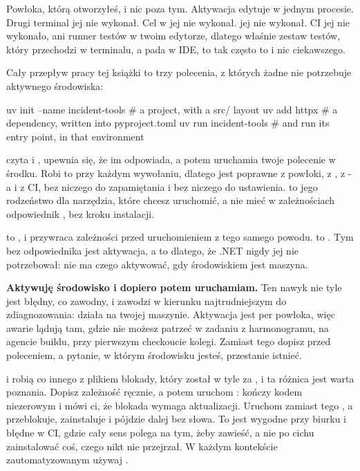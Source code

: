 Powłoka, którą otworzyłeś, i nic poza tym. Aktywacja edytuje  w
jednym procesie. Drugi terminal jej nie wykonał. Cel w  jej nie
wykonał.  jej nie wykonał. CI jej nie wykonało, ani runner testów w
twoim edytorze, dlatego właśnie zestaw testów, który przechodzi w terminalu, a
pada w IDE, to tak często to i nic ciekawszego.

Cały przepływ pracy tej książki to trzy polecenia, z których żadne nie
potrzebuje aktywnego środowiska:

\begin{shellcmd}
uv init --name incident-tools  # a project, with a src/ layout
uv add httpx                   # a dependency, written into pyproject.toml
uv run incident-tools          # and run its entry point, in that environment
\end{shellcmd}

\noindent
{} czyta  i , upewnia się, że
 im odpowiada, a potem uruchamia twoje polecenie w środku. Robi to
przy każdym wywołaniu, dlatego jest poprawne z powłoki, z , z
-a i z CI, bez niczego do zapamiętania i bez niczego do
ustawienia.  to jego rodzeństwo dla narzędzia, które chcesz
uruchomić, a nie mieć w zależnościach \dash{} odpowiednik ,
bez kroku instalacji.

\begin{csbox}
 to , i przywraca zależności przed
uruchomieniem z tego samego powodu.  to . Tym bez odpowiednika jest aktywacja, a to dlatego, że .NET nigdy jej
nie potrzebował: nie ma czego aktywować, gdy środowiskiem jest maszyna.
\end{csbox}

\begin{trapbox}
\textbf{Aktywuję środowisko i dopiero potem uruchamiam.} Ten nawyk nie tyle
jest błędny, co zawodny, i zawodzi w kierunku najtrudniejszym do
zdiagnozowania: działa na twojej maszynie. Aktywacja jest per powłoka, więc
awarie lądują tam, gdzie nie możesz patrzeć \dash{} w zadaniu z
harmonogramu, na agencie buildu, przy pierwszym checkoucie kolegi. Zamiast
tego dopisz  przed poleceniem, a pytanie, w którym środowisku
jesteś, przestanie istnieć.
\end{trapbox}

\begin{warning}
 i  robią co innego z plikiem blokady,
który został w tyle za , i ta różnica jest warta
poznania. Dopisz zależność ręcznie, a potem uruchom :
kończy kodem niezerowym i mówi ci, że blokada wymaga aktualizacji. Uruchom
zamiast tego , a przeblokuje, zainstaluje i pójdzie dalej bez
słowa. To jest wygodne przy biurku i błędne w CI, gdzie cały sens polega na
tym, żeby zawieść, a nie po cichu zainstalować coś, czego nikt nie
przejrzał. W każdym kontekście zautomatyzowanym używaj
.
\end{warning}

